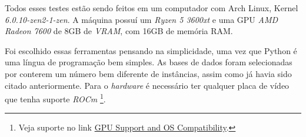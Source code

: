 Todos esses testes estão sendo feitos em um computador com Arch Linux, Kernel \emph{6.0.10-zen2-1-zen}.
A máquina possuí um \emph{Ryzen 5 3600xt} e uma GPU \emph{AMD Radeon 7600} de 8GB de \emph{VRAM}, com 16GB de memória RAM.

Foi escolhido essas ferramentas pensando na simplicidade, uma vez que Python é uma língua de programação
bem simples. As bases de dados foram selecionadas por conterem um número bem diferente de instâncias, assim
como já havia sido citado anteriormente. Para o \emph{hardware} é necessário ter qualquer placa de vídeo
que tenha suporte \emph{ROCm} \footnote[2]{Veja suporte no link \href{https://rocm.docs.amd.com/en/latest/release/gpu_os_support.html}{GPU Support and OS Compatibility}.}.
